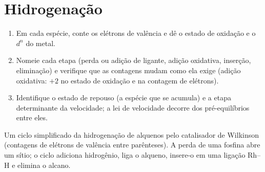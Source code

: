 \section{Hidrogenação}

\begin{method}\label{met:b3:homogeneous-catalysis:read-cycle}
\begin{enumerate}
  \item Em cada espécie, conte os elétrons de valência e dê o estado de oxidação
        e o $d^n$ do metal.
  \item Nomeie cada etapa (perda ou adição de ligante, adição oxidativa,
        inserção, eliminação) e verifique que as contagens mudam como ela exige
        (adição oxidativa: $+2$ no estado de oxidação e na contagem de elétrons).
  \item Identifique o estado de repouso (a espécie que se acumula) e a
        etapa determinante da velocidade; a lei de velocidade decorre dos pré-equilíbrios
        entre eles.
\end{enumerate}
\end{method}

\begin{omfigure}

{\small Um ciclo simplificado da hidrogenação de alquenos pelo catalisador de Wilkinson
(contagens de elétrons de valência entre parênteses). A perda de uma fosfina abre um sítio; o
ciclo adiciona hidrogênio, liga o alqueno, insere-o em uma ligação Rh--H e
elimina o alcano.}
\end{omfigure}

